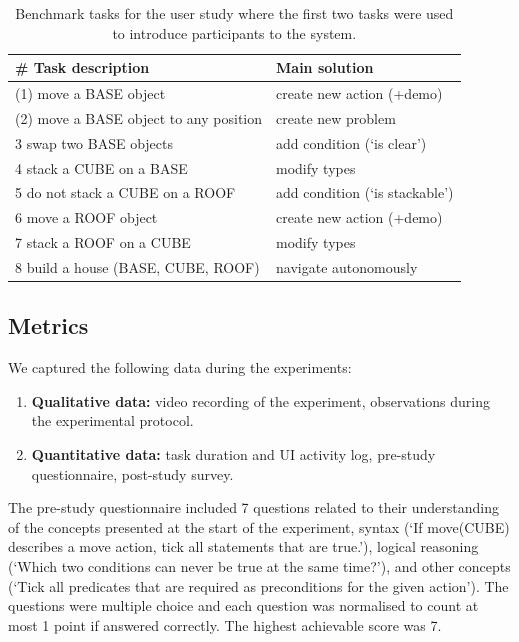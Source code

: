 \begin{table}[h]
	\centering
	\caption{Benchmark tasks for the user study where the first two tasks were used to introduce participants to the system.}
	\label{table:userstudytasks}
	\begin{center}
		\begin{tabular}{ll}
			\# Task description & Main solution \\ \hline
			(1) move a BASE object & create new action (+demo) \\
			(2) move a BASE object to any position & create new problem \\
			3 swap two BASE objects & add condition (`is clear') \\
			4 stack a CUBE on a BASE & modify types\\
			5 do not stack a CUBE on a ROOF & add condition (`is stackable')\\
			6 move a ROOF object & create new action (+demo) \\
			7 stack a ROOF on a CUBE & modify types  \\
			8 build a house (BASE, CUBE, ROOF) & navigate autonomously \\ \hline
		\end{tabular}
	\end{center}
\end{table}

\subsection{Metrics}
We captured the following data during the experiments:
\begin{enumerate}
    \item \textbf{Qualitative data:} video recording of the experiment, observations during the experimental protocol.
    \item \textbf{Quantitative data:} task duration and UI activity log, pre-study questionnaire, post-study survey.
\end{enumerate}

The pre-study questionnaire included 7 questions related to their understanding of the concepts presented at the start of the experiment, \eg syntax (`If move(CUBE) describes a move action, tick all statements that are true.'), logical reasoning 
(`Which two conditions can never be true at the same time?'), and other concepts (`Tick all predicates that are required as preconditions for the given action').
The questions were multiple choice and each question was normalised to count at most 1 point if answered correctly.
The highest achievable score was 7.

